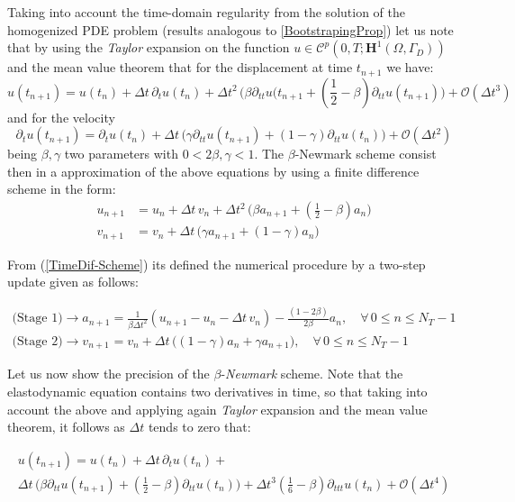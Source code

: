 Taking into account the time-domain regularity from the solution of the homogenized PDE problem (results analogous to \ref{BootstrapingProp}) let us note that by using the \textit{Taylor} expansion on the function $u \in \mathcal{C}^{p}(0,T;\mathbf{H}^1(\Omega, \Gamma_D))$ and the mean value theorem that for the displacement at time $t_{n+1}$ we have:
\begin{equation*}
    u(t_{n+1}) = u(t_n) + \Delta t \, \partial_{t} u(t_n) + \Delta t^2 \, \big( \beta \partial_{tt} u(t_{n+1} + (\frac{1}{2} - \beta) \partial_{tt} u(t_{n+1}) \big) + \mathcal{O}(\Delta t^3)    
\end{equation*}
and for the velocity
\begin{equation*}
    \partial_{t} u(t_{n+1}) = \partial_{t} u (t_{n}) + \Delta t \, \big( \gamma \partial_{tt} u(t_{n+1}) + (1-\gamma) \partial_{tt} u(t_n) \big) + \mathcal{O}(\Delta t^2)
\end{equation*}
being $\beta, \gamma$ two parameters with $0 < 2\beta, \gamma < 1$.
The $\beta$-Newmark scheme consist then in a approximation of the above equations by using a finite difference scheme in the form:
\begin{align}
    \label{TimeDif-Scheme}
    u_{n+1} &= u_{n} + \Delta t\, v_{n} + \Delta t^2 \, \big( \beta a_{n+1} + (\frac{1}{2} - \beta) a_n \big) \\
    v_{n+1} &= v_n + \Delta t\, \big( \gamma a_{n+1} + (1-\gamma) a_{n} \big)
\end{align}

From (\ref{TimeDif-Scheme}) its defined the numerical procedure by a two-step update given as follows:

\begin{align}
    \label{TwoStage-Update}
    \text{(Stage 1)}\longrightarrow  a_{n+1} &= \frac{1}{\beta \Delta t^2} ( u_{n+1}-u_n - \Delta t \, v_n) - \frac{(1-2\beta)}{2 \beta} a_n, \quad \forall \, 0 \leq n \leq N_T-1 \\
    \text{(Stage 2)}\longrightarrow v_{n+1} &= v_n + \Delta t \, \big( (1-\gamma) a_n + \gamma a_{n+1} \big), \quad \forall \, 0 \leq n \leq N_T-1
\end{align}

Let us now show the precision of the $\beta$-\textit{Newmark} scheme. Note that the elastodynamic equation contains two derivatives in time, so that taking into account the above and applying again \textit{Taylor} expansion and the mean value theorem, it follows as $\Delta t$ tends to zero that:

\begin{multline}
    u(t_{n+1}) = u(t_{n}) + \Delta t \, \partial_{t} u(t_n) + \\
    \Delta t \, \big( \beta \partial_{tt} u(t_{n+1}) + (\frac{1}{2}- \beta) \partial_{tt} u(t_n) \big) + \Delta t^3 (\frac{1}{6}-\beta) \partial_{ttt}u(t_n) + \mathcal{O}(\Delta t^4)
\end{multline}


